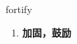 
\begin{frame}
{\huge fortify}
\begin{center}
\begin{enumerate}\Large
  \item \textbf{加固，鼓励}
\end{enumerate}
\end{center}
\end{frame}
